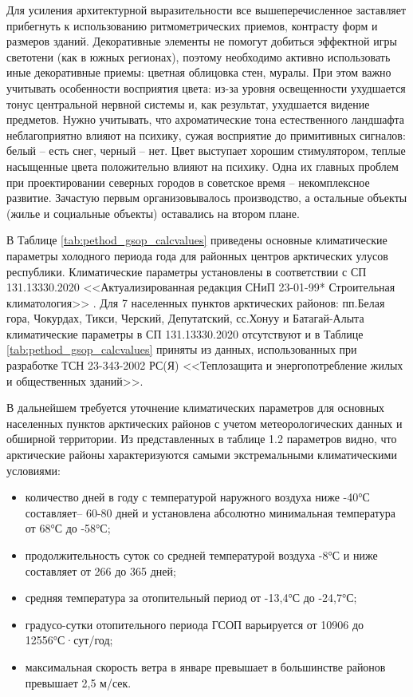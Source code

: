 

Для усиления архитектурной выразительности все вышеперечисленное заставляет прибегнуть к использованию ритмометрических приемов, контрасту форм и размеров зданий. Декоративные элементы не помогут добиться эффектной игры светотени (как в южных регионах), поэтому необходимо активно использовать иные декоративные приемы: цветная облицовка стен, муралы. При этом важно учитывать особенности восприятия цвета: из-за уровня освещенности ухудшается тонус центральной нервной системы и, как результат, ухудшается видение предметов. Нужно учитывать, что ахроматические тона естественного ландшафта неблагоприятно влияют на психику, сужая восприятие до примитивных сигналов: белый – есть снег, черный – нет. Цвет выступает хорошим стимулятором, теплые насыщенные цвета положительно влияют на психику.
Одна их главных проблем при проектировании северных городов в советское время – некомплексное развитие. Зачастую первым организовывалось производство, а остальные объекты (жилье и социальные объекты) оставались на втором плане.

В Таблице \ref{tab:pethod_gsop_calcvalues} приведены основные климатические параметры холодного периода года для районных центров арктических улусов республики.
Климатические параметры установлены в соответствии с СП 131.13330.2020 <<Актуализированная редакция СНиП 23-01-99* Строительная климатология>> \Code{[19]}.
Для 7 населенных пунктов арктических районов: пп.Белая гора, Чокурдах, Тикси, Черский, Депутатский,
сс.Хонуу и Батагай-Алыта климатические параметры в СП 131.13330.2020 \Code{[19]} отсутствуют и в Таблице \ref{tab:pethod_gsop_calcvalues} приняты из данных,
использованных при разработке ТСН 23-343-2002 РС(Я) <<Теплозащита и энергопотребление жилых и общественных зданий>>.

В дальнейшем требуется уточнение климатических параметров для основных населенных пунктов арктических районов с учетом метеорологических данных и обширной территории.
Из представленных в таблице 1.2 параметров видно, что арктические районы характеризуются самыми экстремальными климатическими условиями:
\begin{itemize}
    \item количество дней в году с температурой наружного воздуха ниже -40°С составляет– 60-80 дней и установлена абсолютно минимальная температура от 68°С до -58°С;  
    \item продолжительность суток со средней температурой воздуха -8°С и ниже составляет от 266 до 365 дней;
    \item средняя температура за отопительный период от -13,4°С до -24,7°С;
    \item градусо-сутки отопительного периода ГСОП варьируется от 10906 до 12556°С·сут/год;
    \item максимальная скорость ветра в январе превышает в большинстве районов превышает 2,5 м/сек.
\end{itemize}

